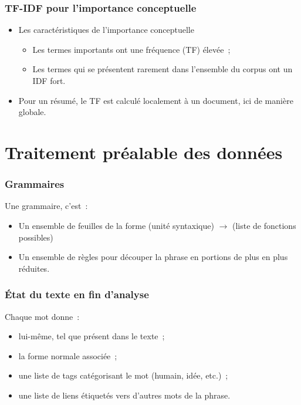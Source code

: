 \documentclass[12pt, handout]{beamer}
\begin{document}
\begin{frame}
 \frametitle{TF-IDF pour l'importance conceptuelle}
 \begin{itemize}
  	\item Les caractéristiques de l'importance conceptuelle
  	\begin{itemize}
  		\item Les termes importants ont une fréquence (TF) élevée~;
 		\item Les termes qui se présentent rarement dans l'ensemble du corpus ont un IDF fort.
  	\end{itemize}
  	\item Pour un résumé, le TF est calculé localement à un document, ici de manière globale.
  \end{itemize}

  
\end{frame}


\section{Traitement préalable des données}


\begin{frame}
 \frametitle{Grammaires}
 Une grammaire, c'est~:
 \begin{itemize}
  \item Un ensemble de feuilles de la forme (unité syntaxique) $\rightarrow$ (liste de fonctions possibles)
  \item Un ensemble de règles pour découper la phrase en portions de plus en plus réduites.
 \end{itemize}
 
\end{frame}

\begin{frame}
 \frametitle{État du texte en fin d'analyse}
 Chaque mot donne~:
 \begin{itemize}
  \item lui-même, tel que présent dans le texte~;
  \item la forme normale associée~;
  \item une liste de tags catégorisant le mot (humain, idée, etc.)~;
  \item une liste de liens étiquetés vers d'autres mots de la phrase.
 \end{itemize}
 
 
\end{frame}
\end{document}
